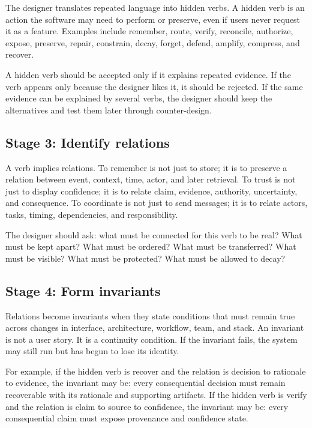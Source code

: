 \documentclass[11pt]{article}
\begin{document}
The designer translates repeated language into hidden verbs. A hidden verb is an action the software may need to perform or preserve, even if users never request it as a feature. Examples include remember, route, verify, reconcile, authorize, expose, preserve, repair, constrain, decay, forget, defend, amplify, compress, and recover.

A hidden verb should be accepted only if it explains repeated evidence. If the verb appears only because the designer likes it, it should be rejected. If the same evidence can be explained by several verbs, the designer should keep the alternatives and test them later through counter-design.

\subsection{Stage 3: Identify relations}

A verb implies relations. To remember is not just to store; it is to preserve a relation between event, context, time, actor, and later retrieval. To trust is not just to display confidence; it is to relate claim, evidence, authority, uncertainty, and consequence. To coordinate is not just to send messages; it is to relate actors, tasks, timing, dependencies, and responsibility.

The designer should ask: what must be connected for this verb to be real? What must be kept apart? What must be ordered? What must be transferred? What must be visible? What must be protected? What must be allowed to decay?

\subsection{Stage 4: Form invariants}

Relations become invariants when they state conditions that must remain true across changes in interface, architecture, workflow, team, and stack. An invariant is not a user story. It is a continuity condition. If the invariant fails, the system may still run but has begun to lose its identity.

For example, if the hidden verb is recover and the relation is decision to rationale to evidence, the invariant may be: every consequential decision must remain recoverable with its rationale and supporting artifacts. If the hidden verb is verify and the relation is claim to source to confidence, the invariant may be: every consequential claim must expose provenance and confidence state.
\end{document}
